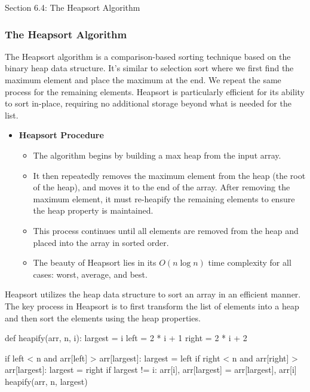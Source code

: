 \begin{notes}{Section 6.4: The Heapsort Algorithm}
    \subsubsection*{The Heapsort Algorithm}

    The Heapsort algorithm is a comparison-based sorting technique based on the binary heap data structure. It's similar to selection sort where we first find the maximum element and place the maximum 
    at the end. We repeat the same process for the remaining elements. Heapsort is particularly efficient for its ability to sort in-place, requiring no additional storage beyond what is needed for the 
    list.
    
    \begin{itemize}
        \item \textbf{Heapsort Procedure}
        \begin{itemize}
            \item The algorithm begins by building a max heap from the input array.
            \item It then repeatedly removes the maximum element from the heap (the root of the heap), and moves it to the end of the array. After removing the maximum element, it must re-heapify the 
            remaining elements to ensure the heap property is maintained.
            \item This process continues until all elements are removed from the heap and placed into the array in sorted order.
            \item The beauty of Heapsort lies in its $O(n \log n)$ time complexity for all cases: worst, average, and best.
        \end{itemize}
    \end{itemize}
    
    \begin{highlight}
        Heapsort utilizes the heap data structure to sort an array in an efficient manner. The key process in Heapsort is to first transform the list of elements into a heap and then sort the elements 
        using the heap properties.
    \begin{code}[Python]
    def heapify(arr, n, i):
        largest = i
        left = 2 * i + 1
        right = 2 * i + 2
    
        if left < n and arr[left] > arr[largest]:
            largest = left
        if right < n and arr[right] > arr[largest]:
            largest = right
        if largest != i:
            arr[i], arr[largest] = arr[largest], arr[i]
            heapify(arr, n, largest)
    

\end{code}
\end{highlight}
\end{notes}
